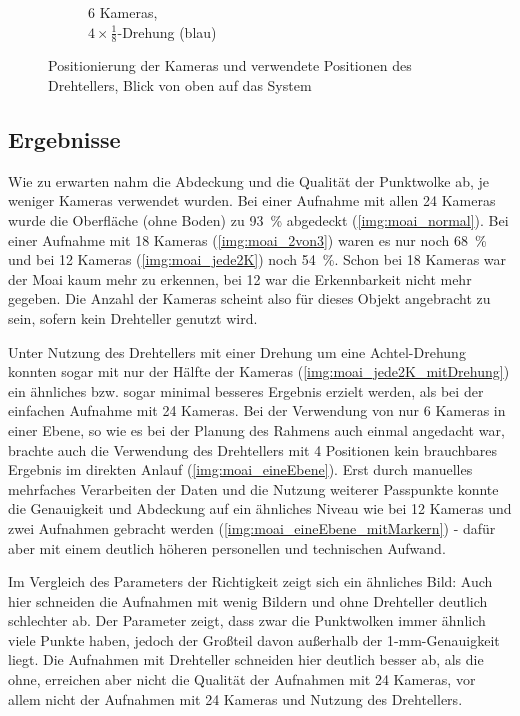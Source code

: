 \documentclass[./00PhotoBox.tex]{subfiles}
\begin{document}
\begin{figure}
\begin{subfigure}{0.48\textwidth}
        \caption{
            6 Kameras, \\
            $4 \times \frac{1}{8}$-Drehung (blau)
        }
        \label{img:kameras_ebene}
    \end{subfigure}
    \caption{Positionierung der Kameras und verwendete Positionen des Drehtellers, Blick von oben auf das System}
    \label{img:ueberblick_cam_position}
\end{figure}


\subsection{Ergebnisse}
Wie zu erwarten nahm die Abdeckung und die Qualität der Punktwolke ab, je weniger Kameras verwendet wurden. Bei einer Aufnahme mit allen 24 Kameras wurde die Oberfläche (ohne Boden) zu \SI{93}{\percent} abgedeckt (\autoref{img:moai_normal}). Bei einer Aufnahme mit 18 Kameras (\autoref{img:moai_2von3}) waren es nur noch \SI{68}{\percent} und bei 12 Kameras (\autoref{img:moai_jede2K}) noch \SI{54}{\percent}.  Schon bei 18 Kameras war der Moai kaum mehr zu erkennen, bei 12 war die Erkennbarkeit nicht mehr gegeben. Die Anzahl der Kameras scheint also für dieses Objekt angebracht zu sein, sofern kein Drehteller genutzt wird.

Unter Nutzung des Drehtellers mit einer Drehung um eine Achtel-Drehung konnten sogar mit nur der Hälfte der Kameras (\autoref{img:moai_jede2K_mitDrehung}) ein ähnliches bzw. sogar minimal besseres Ergebnis erzielt werden, als bei der einfachen Aufnahme mit 24 Kameras. Bei der Verwendung von nur 6 Kameras in einer Ebene, so wie es bei der Planung des Rahmens auch einmal angedacht war, brachte auch die Verwendung des Drehtellers mit 4 Positionen kein brauchbares Ergebnis im direkten Anlauf (\autoref{img:moai_eineEbene}). Erst durch manuelles mehrfaches Verarbeiten der Daten und die Nutzung weiterer Passpunkte konnte die Genauigkeit und Abdeckung auf ein ähnliches Niveau wie bei 12 Kameras und zwei Aufnahmen gebracht werden (\autoref{img:moai_eineEbene_mitMarkern}) - dafür aber mit einem deutlich höheren personellen und technischen Aufwand.

Im Vergleich des Parameters der Richtigkeit zeigt sich ein ähnliches Bild: Auch hier schneiden die Aufnahmen mit wenig Bildern und ohne Drehteller deutlich schlechter ab. Der Parameter zeigt, dass zwar die Punktwolken immer ähnlich viele Punkte haben, jedoch der Großteil davon außerhalb der 1-mm-Genauigkeit liegt. Die Aufnahmen mit Drehteller schneiden hier deutlich besser ab, als die ohne, erreichen aber nicht die Qualität der Aufnahmen mit 24 Kameras, vor allem nicht der Aufnahmen mit 24 Kameras und Nutzung des Drehtellers.
\end{document}
